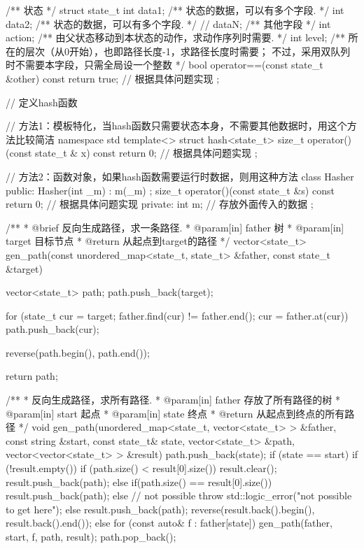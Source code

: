 \begin{Codex}[label=bfs_common.h]
/** 状态 */
struct state_t {
    int data1;  /** 状态的数据，可以有多个字段. */
    int data2;  /** 状态的数据，可以有多个字段. */
    // dataN;   /** 其他字段 */
    int action; /** 由父状态移动到本状态的动作，求动作序列时需要. */
    int level;  /** 所在的层次（从0开始），也即路径长度-1，求路径长度时需要；
                    不过，采用双队列时不需要本字段，只需全局设一个整数 */
    bool operator==(const state_t &other) const {
        return true;  // 根据具体问题实现
    }
};

// 定义hash函数

// 方法1：模板特化，当hash函数只需要状态本身，不需要其他数据时，用这个方法比较简洁
namespace std {
template<> struct hash<state_t> {
    size_t operator()(const state_t & x) const {
        return 0; // 根据具体问题实现
    }
};
}

// 方法2：函数对象，如果hash函数需要运行时数据，则用这种方法
class Hasher {
public:
    Hasher(int _m) : m(_m) {};
    size_t operator()(const state_t &s) const {
        return 0; // 根据具体问题实现
    }
private:
    int m; // 存放外面传入的数据
};

/**
 * @brief 反向生成路径，求一条路径.
 * @param[in] father 树
 * @param[in] target 目标节点
 * @return 从起点到target的路径
 */
vector<state_t> gen_path(const unordered_map<state_t, state_t> &father,
        const state_t &target) {
    vector<state_t> path;
    path.push_back(target);

    for (state_t cur = target; father.find(cur) != father.end(); 
            cur = father.at(cur))
        path.push_back(cur);

    reverse(path.begin(), path.end());

    return path;
}

/**
 * 反向生成路径，求所有路径.
 * @param[in] father 存放了所有路径的树
 * @param[in] start 起点
 * @param[in] state 终点
 * @return 从起点到终点的所有路径
 */
void gen_path(unordered_map<state_t, vector<state_t> > &father,
        const string &start, const state_t& state, vector<state_t> &path,
        vector<vector<state_t> > &result) {
    path.push_back(state);
    if (state == start) {
        if (!result.empty()) {
            if (path.size() < result[0].size()) {
                result.clear();
                result.push_back(path);
            } else if(path.size() == result[0].size()) {
                result.push_back(path);
            } else {
                // not possible
                throw std::logic_error("not possible to get here");
            }
        } else {
            result.push_back(path);
        }
        reverse(result.back().begin(), result.back().end());
    } else {
        for (const auto& f : father[state]) {
            gen_path(father, start, f, path, result);
        }
    }
    path.pop_back();
}
\end{Codex}



